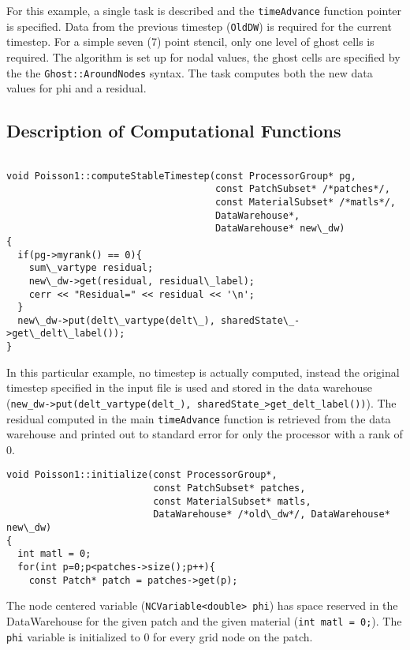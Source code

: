 \documentclass[12pt]{report}
\begin{document}
For this example, a single task is described and the
\texttt{timeAdvance} function pointer is specified.  Data from the
previous timestep (\texttt{OldDW}) is required for the current
timestep.  For a simple seven (7) point stencil, only one level of
ghost cells is required.  The algorithm is set up for nodal values,
the ghost cells are specified by the the \texttt{Ghost::AroundNodes}
syntax.  The task computes both the new data values for phi and a
residual.

\subsection{Description of Computational Functions}

\begin{verbatim}

void Poisson1::computeStableTimestep(const ProcessorGroup* pg,
                                     const PatchSubset* /*patches*/,
                                     const MaterialSubset* /*matls*/,
                                     DataWarehouse*,
                                     DataWarehouse* new\_dw)
{
  if(pg->myrank() == 0){
    sum\_vartype residual;
    new\_dw->get(residual, residual\_label);
    cerr << "Residual=" << residual << '\n';
  }
  new\_dw->put(delt\_vartype(delt\_), sharedState\_->get\_delt\_label());
}

\end{verbatim}

In this particular example, no timestep is actually computed, instead
the original timestep specified in the input file is used and stored
in the data warehouse (\texttt{new\_dw->put(delt\_vartype(delt\_),
  sharedState\_\->get\_delt\_label())}).  The residual computed in the
main \texttt{timeAdvance} function is retrieved from the data
warehouse and printed out to standard error for only the processor
with a rank of 0.

\begin{verbatim}
void Poisson1::initialize(const ProcessorGroup*,
                          const PatchSubset* patches,
                          const MaterialSubset* matls,
                          DataWarehouse* /*old\_dw*/, DataWarehouse* new\_dw)
{
  int matl = 0;
  for(int p=0;p<patches->size();p++){
    const Patch* patch = patches->get(p);

\end{verbatim}

The node centered variable (\texttt{NCVariable<double> phi}) has space
reserved in the DataWarehouse for the given patch and the given
material (\texttt{int matl = 0;}).  The \texttt{phi} variable is
initialized to 0 for every grid node on the patch.
\end{document}
